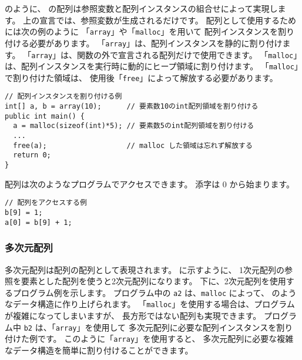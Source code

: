 のように、
\cmml の配列は参照変数と配列インスタンスの組合せによって実現します。
上の宣言では、参照変数が生成されるだけです。
配列として使用するためには次の例のように
「\verb/array/」や「\verb/malloc/」を用いて
配列インスタンスを割り付ける必要があります。
「\verb/array/」は、配列インスタンスを静的に割り付けます。
「\verb/array/」は、関数の外で宣言される配列だけで使用できます。
「\verb/malloc/」は、配列インスタンスを実行時に動的にヒープ領域に割り付けます。
「\verb/malloc/」で割り付けた領域は、
使用後「\verb/free/」によって解放する必要があります。

\begin{mylist}
\begin{verbatim}
// 配列インスタンスを割り付ける例
int[] a, b = array(10);      // 要素数10のint配列領域を割り付ける
public int main() {
  a = malloc(sizeof(int)*5); // 要素数5のint配列領域を割り付ける
  ...
  free(a);                   // malloc した領域は忘れず解放する
  return 0;
}
\end{verbatim}
\end{mylist}

配列は次のようなプログラムでアクセスできます。
添字は 0 から始まります。

\begin{mylist}
\begin{verbatim}
// 配列をアクセスする例
b[9] = 1;
a[0] = b[9] + 1;
\end{verbatim}
\end{mylist}

\subsubsection{多次元配列}

多次元配列は配列の配列として表現されます。
に示すように、
1次元配列の参照を要素とした配列を使うと2次元配列になります。
下に、2次元配列を使用するプログラム例を示します。
プログラム中の \verb/a2/ は、\verb/malloc/ によって、
のようなデータ構造に作り上げられます。
「\verb/malloc/」を使用する場合は、プログラムが複雑になってしまいますが、
長方形ではない配列も実現できます。
プログラム中 \verb/b2/ は、「\verb/array/」を使用して
多次元配列に必要な配列インスタンスを割り付けた例です。
このように「\verb/array/」を使用すると、
多次元配列に必要な複雑なデータ構造を簡単に割り付けることができます。


